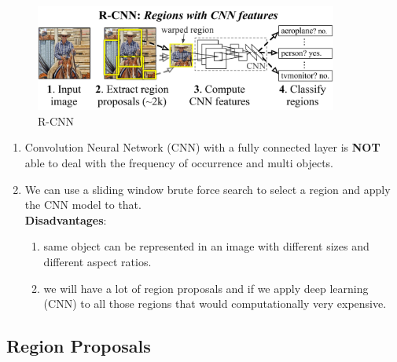 \begin{figure}[H]
    \centering
    \includegraphics[width=\linewidth, height=3.5cm, keepaspectratio]{Pictures/convolutional-neural-network/rcnn-splash-method.jpg}
    \caption{R-CNN}
\end{figure}

\begin{enumerate}
    \item Convolution Neural Network (CNN) with a fully connected layer is \textbf{NOT} able to deal with the frequency of occurrence and multi objects.

    \item We can use a sliding window brute force search to select a region and apply the CNN model to that.\\
    \textbf{Disadvantages}:
    \begin{enumerate}
        \item same object can be represented in an image with different sizes and different aspect ratios.

        \item we will have a lot of region proposals and if we apply deep learning (CNN) to all those regions that would computationally very expensive.

    \end{enumerate}
    
\end{enumerate}

\subsection{Region Proposals \cite{arxiv-1311.2524v5-rcnn,https://www.geeksforgeeks.org/r-cnn-region-based-cnns/}}

